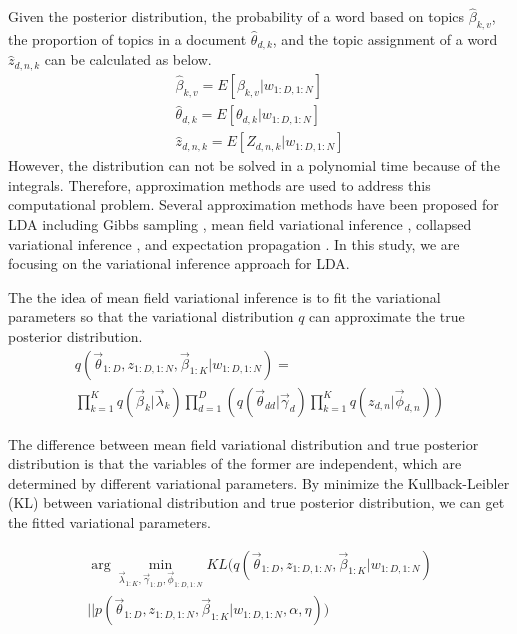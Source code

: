 \documentclass[conference]{IEEEtran}
\begin{document}
Given the posterior distribution, the probability of a word based on topics $\hat{\beta}_{k,v}$, the proportion of topics in a document $\hat{\theta}_{d,k}$, and the topic assignment of a word $\hat{z}_{d,n,k}$  can be calculated as below.
\begin{equation}
\begin{split}
\hat{\beta}_{k,v} = E[\beta_{k,v}|w_{1:D,1:N}]\\
\hat{\theta}_{d,k} = E[\theta_{d,k}|w_{1:D,1:N}]\\
\hat{z}_{d,n,k} = E[Z_{d,n,k}|w_{1:D,1:N}]
\end{split}
\end{equation}
However, the distribution can not be solved in a polynomial time because of the integrals. Therefore, approximation methods are used to address this computational problem. Several approximation methods have been proposed for LDA including Gibbs sampling \cite{steyvers2007probabilistic}, mean field variational inference \cite{blei2003latent}, collapsed variational inference \cite{teh2006collapsed}, and expectation propagation \cite{minka2002expectation}. In this study, we are focusing on the variational inference approach for LDA.


The the idea of mean field variational inference is to fit the variational parameters so that the variational distribution $q$ can approximate the true posterior distribution.
\begin{equation}
\begin{split}
q(\overrightarrow{\theta}_{1:D},z_{1:D,1:N},\overrightarrow{\beta}_{1:K}|w_{1:D,1:N})=\\
\prod_{k=1}^{K}{q(\overrightarrow{\beta}_k|\overrightarrow{\lambda}_k)}\prod_{d=1}^{D}\left({q(\overrightarrow{\theta}_{dd}|\overrightarrow{\gamma}_d)}\prod_{k=1}^{K}{q(z_{d,n}|\overrightarrow{\phi}_{d,n})}\right)
\end{split}
\end{equation}

The difference between mean field variational distribution and true posterior distribution is that the variables of the former are independent, which are determined by different variational parameters. By minimize the Kullback-Leibler (KL) between variational distribution and true posterior distribution, we can get the fitted variational parameters.

\begin{equation}
\begin{split}
\arg \min_{\overrightarrow{\lambda}_{1:K},\overrightarrow{\gamma}_{1:D},\overrightarrow{\phi}_{1:D,1:N}} KL(q(\overrightarrow{\theta}_{1:D},z_{1:D,1:N},\overrightarrow{\beta}_{1:K}|w_{1:D,1:N})\\
||p(\overrightarrow{\theta}_{1:D},z_{1:D,1:N},\overrightarrow{\beta}_{1:K}|w_{1:D,1:N},\alpha,\eta))
\end{split}
\end{equation}
\end{document}

